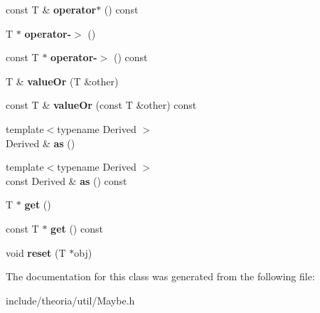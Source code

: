 \begin{DoxyCompactItemize}
\item 
\hypertarget{classtheoria_1_1util_1_1Maybe_a8e0bd6b8a7de758225a3947fe7b8a787}{const T \& {\bfseries operator$\ast$} () const }\label{classtheoria_1_1util_1_1Maybe_a8e0bd6b8a7de758225a3947fe7b8a787}

\item 
\hypertarget{classtheoria_1_1util_1_1Maybe_ae85df3b0214529075af8010ed943ae83}{T $\ast$ {\bfseries operator-\/$>$} ()}\label{classtheoria_1_1util_1_1Maybe_ae85df3b0214529075af8010ed943ae83}

\item 
\hypertarget{classtheoria_1_1util_1_1Maybe_acdc88ebca9bc1f285f1815de460f732b}{const T $\ast$ {\bfseries operator-\/$>$} () const }\label{classtheoria_1_1util_1_1Maybe_acdc88ebca9bc1f285f1815de460f732b}

\item 
\hypertarget{classtheoria_1_1util_1_1Maybe_a0277381962cd4f2dc1d92f75a4cd964c}{T \& {\bfseries value\+Or} (T \&other)}\label{classtheoria_1_1util_1_1Maybe_a0277381962cd4f2dc1d92f75a4cd964c}

\item 
\hypertarget{classtheoria_1_1util_1_1Maybe_a1eb2981ee1dbbef8257032380083fe47}{const T \& {\bfseries value\+Or} (const T \&other) const }\label{classtheoria_1_1util_1_1Maybe_a1eb2981ee1dbbef8257032380083fe47}

\item 
\hypertarget{classtheoria_1_1util_1_1Maybe_adfa406b81887a9dd40683e1c690d7367}{{\footnotesize template$<$typename Derived $>$ }\\Derived \& {\bfseries as} ()}\label{classtheoria_1_1util_1_1Maybe_adfa406b81887a9dd40683e1c690d7367}

\item 
\hypertarget{classtheoria_1_1util_1_1Maybe_aa4286d1c5044da33984b804228372dbd}{{\footnotesize template$<$typename Derived $>$ }\\const Derived \& {\bfseries as} () const }\label{classtheoria_1_1util_1_1Maybe_aa4286d1c5044da33984b804228372dbd}

\item 
\hypertarget{classtheoria_1_1util_1_1Maybe_aeee7f778958a3c253f7ba57d190e55fe}{T $\ast$ {\bfseries get} ()}\label{classtheoria_1_1util_1_1Maybe_aeee7f778958a3c253f7ba57d190e55fe}

\item 
\hypertarget{classtheoria_1_1util_1_1Maybe_acec5c92092539b05c33e3b936fe8aeb4}{const T $\ast$ {\bfseries get} () const }\label{classtheoria_1_1util_1_1Maybe_acec5c92092539b05c33e3b936fe8aeb4}

\item 
\hypertarget{classtheoria_1_1util_1_1Maybe_a2e841f2d88d2fefa3d9936a1edadfae4}{void {\bfseries reset} (T $\ast$obj)}\label{classtheoria_1_1util_1_1Maybe_a2e841f2d88d2fefa3d9936a1edadfae4}

\end{DoxyCompactItemize}


The documentation for this class was generated from the following file\+:\begin{DoxyCompactItemize}
\item 
include/theoria/util/Maybe.\+h\end{DoxyCompactItemize}
